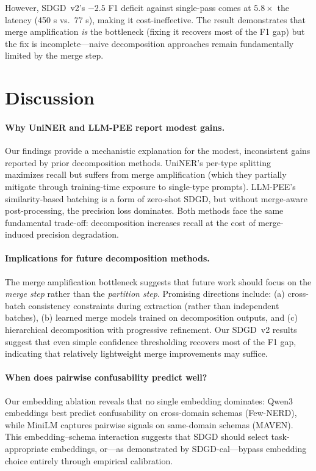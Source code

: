 \documentclass[11pt,a4paper]{article}
\begin{document}
However, SDGD~v2's $-2.5$ F1 deficit against single-pass comes at $5.8\times$ the latency (450 s vs.\ 77 s), making it cost-ineffective. The result demonstrates that merge amplification \emph{is} the bottleneck (fixing it recovers most of the F1 gap) but the fix is incomplete---naive decomposition approaches remain fundamentally limited by the merge step.

\section{Discussion}

\paragraph{Why UniNER and LLM-PEE report modest gains.}
Our findings provide a mechanistic explanation for the modest, inconsistent gains reported by prior decomposition methods. UniNER's per-type splitting maximizes recall but suffers from merge amplification (which they partially mitigate through training-time exposure to single-type prompts). LLM-PEE's similarity-based batching is a form of zero-shot SDGD, but without merge-aware post-processing, the precision loss dominates. Both methods face the same fundamental trade-off: decomposition increases recall at the cost of merge-induced precision degradation.

\paragraph{Implications for future decomposition methods.}
The merge amplification bottleneck suggests that future work should focus on the \emph{merge step} rather than the \emph{partition step}. Promising directions include: (a) cross-batch consistency constraints during extraction (rather than independent batches), (b) learned merge models trained on decomposition outputs, and (c) hierarchical decomposition with progressive refinement. Our SDGD~v2 results suggest that even simple confidence thresholding recovers most of the F1 gap, indicating that relatively lightweight merge improvements may suffice.

\paragraph{When does pairwise confusability predict well?}
Our embedding ablation reveals that no single embedding dominates: Qwen3 embeddings best predict confusability on cross-domain schemas (Few-NERD), while MiniLM captures pairwise signals on same-domain schemas (MAVEN). This embedding--schema interaction suggests that SDGD should select task-appropriate embeddings, or---as demonstrated by SDGD-cal---bypass embedding choice entirely through empirical calibration.
\end{document}
